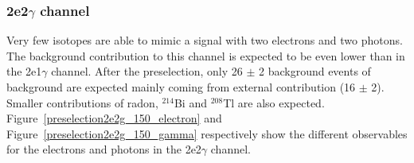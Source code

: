 \documentclass[main.tex]{subfiles}
\begin{document}
\FloatBarrier


\subsubsection{2e2$\gamma$ channel}


\NI Very few isotopes are able to mimic a signal with two electrons and two photons. The background contribution to this channel is expected to be even lower than in the 2e1$\gamma$ channel. After the preselection, only 26 $\pm$ 2 background events of background are expected mainly coming from external contribution (16 $\pm$ 2). Smaller contributions of radon, $^{\text{214}}$Bi and $^{\text{208}}$Tl are also expected. Figure~\ref{preselection2e2g_150_electron} and Figure~\ref{preselection2e2g_150_gamma} respectively show the different observables for the electrons and photons in the 2e2$\gamma$ channel.
\end{document}
